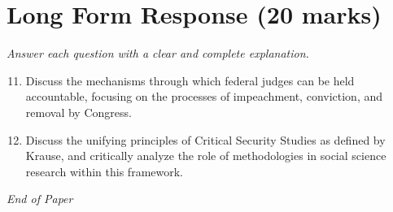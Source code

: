 \documentclass[12pt]{article}
\begin{document}
\section*{Long Form Response (20 marks)}
\textit{Answer each question with a clear and complete explanation.}
\begin{enumerate}[label=\arabic*.]
\setcounter{enumi}{10}
\item Discuss the mechanisms through which federal judges can be held accountable, focusing on the processes of impeachment, conviction, and removal by Congress.
\item Discuss the unifying principles of Critical Security Studies as defined by Krause, and critically analyze the role of methodologies in social science research within this framework.
\end{enumerate}

\vfill
\noindent\textit{End of Paper}
\end{document}
